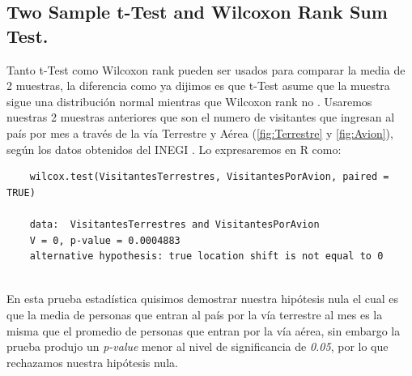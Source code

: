 \documentclass[]{article}
\begin{document}
\subsection{Two Sample t-Test and Wilcoxon Rank Sum Test.}
Tanto t-Test como Wilcoxon rank pueden ser usados para comparar la media de 2 muestras, la diferencia como ya dijimos es que t-Test asume que la muestra sigue una distribución normal mientras que Wilcoxon rank no \cite{Articulo_0}.
Usaremos nuestras 2 muestras anteriores que son el numero de visitantes que ingresan al país por mes a través de la vía Terrestre y Aérea (\autoref{fig:Terrestre} y \autoref{fig:Avion}), según los datos obtenidos del INEGI \cite{inegi}.
Lo expresaremos en R como:
  \begin{lstlisting}
	wilcox.test(VisitantesTerrestres, VisitantesPorAvion, paired = TRUE)
	
	data:  VisitantesTerrestres and VisitantesPorAvion
	V = 0, p-value = 0.0004883
	alternative hypothesis: true location shift is not equal to 0


   \end{lstlisting}
   
 En esta prueba estadística quisimos demostrar  nuestra hipótesis nula el cual es que la media de personas que entran al país por la vía terrestre al mes es la misma que el promedio de personas que entran por la vía aérea, sin embargo la prueba produjo un \textit{p-value}  menor al nivel de significancia de \textit{0.05}, por lo que rechazamos nuestra hipótesis nula.
 
 
\end{document}
